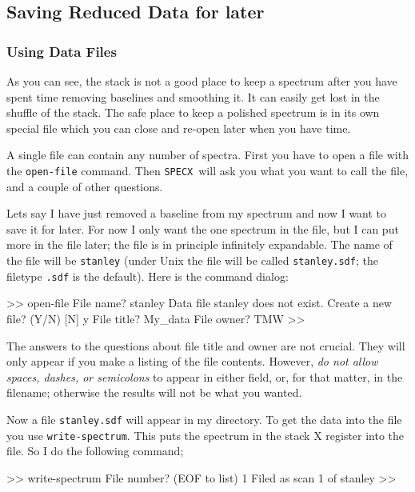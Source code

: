\documentclass[11pt,twoside]{starlink}
\providecommand{\SPECX}{\texttt{SPECX}}
\begin{document}
\subsection{Saving Reduced Data for later}
\label{sec:specx_7}
\subsubsection{Using Data Files}
\label{sec:data-files}
As you can see, the stack is not a good place to keep a spectrum after
you have spent time removing baselines and smoothing it.  It can
easily get lost in the shuffle of the stack.  The safe place to keep a
polished spectrum is in its own special file which you can close and
re-open later when you have time.

A single file can contain any number of spectra.  First you have to
open a file with the \texttt{open-file} command.  Then \SPECX\ will ask
you what you want to call the file, and a couple of other questions.

Lets say I have just removed a baseline from my spectrum and now I
want to save it for later.  For now I only want the one spectrum in the
file, but I can put more in the file later; the file is in principle
infinitely expandable. The name of the file will be \texttt{stanley}
(under Unix the file will be called \texttt{stanley.sdf}; the filetype
\texttt{.sdf} is the default). Here is the command dialog:

\begin{terminalv}
 >> open-file
 File name? stanley
 Data file stanley does not exist.
 Create a new file? (Y/N) [N] y
 File title? My_data
 File owner? TMW
 >>
\end{terminalv}

The answers to the questions about file title and owner are not crucial.
They will only appear if you make a listing of the file contents. However,
\textit{do not allow spaces, dashes, or semicolons} to appear in either
field, or, for that matter, in the filename; otherwise the results will
not be what you wanted.

Now a file \texttt{stanley.sdf} will appear in my directory.  To get the
data into the file you use \texttt{write-spectrum}.  This puts the
spectrum in the stack X register into the file.  So I do the following
command;

\begin{terminalv}
 >> write-spectrum
 File number? (EOF to list) 1
 Filed as scan   1 of stanley
 >>
\end{terminalv}
\end{document}

